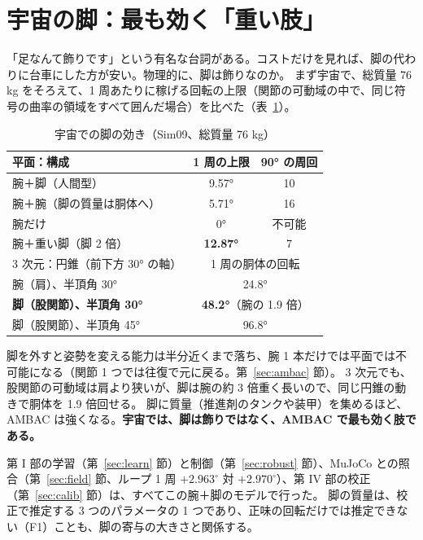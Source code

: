\documentclass[paper=a4paper,fontsize=10pt,twocolumn,column_gap=2zw,line_length=24zw,number_of_lines=46,head_space=20mm]{jlreq}
\begin{document}
\section{宇宙の脚：最も効く「重い肢」}\label{sec:legspace}

「足なんて飾りです」という有名な台詞がある。コストだけを見れば、脚の代わりに台車にした方が安い。物理的に、脚は飾りなのか。
まず宇宙で、総質量 76 kg をそろえて、1 周あたりに稼げる回転の上限（関節の可動域の中で、同じ符号の曲率の領域をすべて囲んだ場合）を比べた（表~\ref{tab:legspace}）。

\begin{table}[t]\centering\small
\caption{宇宙での脚の効き（Sim09、総質量 76 kg）}\label{tab:legspace}
\footnotesize\setlength{\tabcolsep}{2pt}
\begin{tabular}{lcc}\toprule
平面：構成 & 1 周の上限 & 90° の周回 \\\midrule
腕＋脚（人間型） & 9.57° & 10 \\
腕＋腕（脚の質量は胴体へ） & 5.71° & 16 \\
腕だけ & 0° & 不可能 \\
腕＋重い脚（脚 2 倍） & \textbf{12.87°} & 7 \\\midrule
3 次元：円錐（前下方 30° の軸） & \multicolumn{2}{c}{1 周の胴体の回転} \\\midrule
腕（肩）、半頂角 30° & \multicolumn{2}{c}{24.8°} \\
\textbf{脚（股関節）、半頂角 30°} & \multicolumn{2}{c}{\textbf{48.2°}（腕の 1.9 倍）} \\
脚（股関節）、半頂角 45° & \multicolumn{2}{c}{96.8°} \\\bottomrule
\end{tabular}
\end{table}

脚を外すと姿勢を変える能力は半分近くまで落ち、腕 1 本だけでは平面では不可能になる（関節 1 つでは往復で元に戻る。第~\ref{sec:ambac} 節）。
3 次元でも、股関節の可動域は肩より狭いが、脚は腕の約 3 倍重く長いので、同じ円錐の動きで胴体を 1.9 倍回せる。
脚に質量（推進剤のタンクや装甲）を集めるほど、AMBAC は強くなる。\textbf{宇宙では、脚は飾りではなく、AMBAC で最も効く肢である。}

第 I 部の学習（第~\ref{sec:learn} 節）と制御（第~\ref{sec:robust} 節）、MuJoCo との照合（第~\ref{sec:field} 節、ループ 1 周 $+2.963^\circ$ 対 $+2.970^\circ$）、第 IV 部の校正（第~\ref{sec:calib} 節）は、すべてこの腕＋脚のモデルで行った。
脚の質量は、校正で推定する 3 つのパラメータの 1 つであり、正味の回転だけでは推定できない（F1）ことも、脚の寄与の大きさと関係する。
\end{document}
